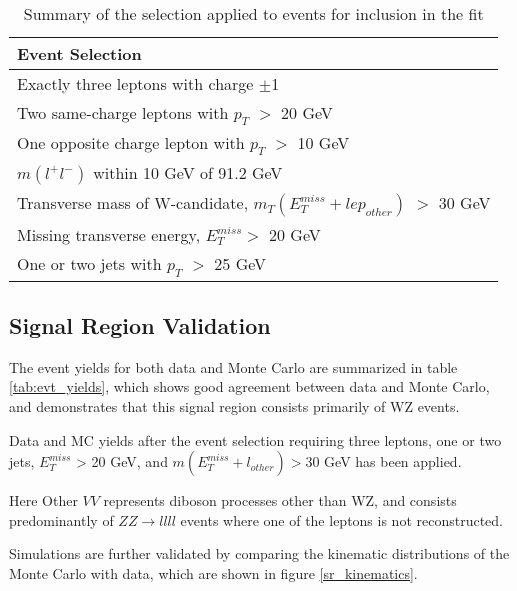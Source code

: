 \begin{table}[h]
    \centering
    \begin{tabular}{l}
        \hline\hline
        Event Selection\\
        \hline 
        Exactly three leptons with charge $\pm$1 \\
        Two same-charge leptons with $p_T$ $>$ 20 GeV \\
        One opposite charge lepton with $p_T$ $>$ 10 GeV \\
        $m(l^+l^-)$ within 10 GeV of 91.2 GeV \\
        Transverse mass of W-candidate, $m_T(E_T^{miss} + lep_{other})$ $>$ 30 GeV \\
        Missing transverse energy, $E_T^{miss} >$ 20 GeV \\
        One or two jets with $p_T$ $>$ 25 GeV \\
        \hline\hline
    \end{tabular}
    \caption{Summary of the selection applied to events for inclusion in the fit}
    \label{tbl:selection}
\end{table}

\subsection{Signal Region Validation}
\label{sec:SRkinematics}

The event yields for both data and Monte Carlo are summarized in table \ref{tab:evt_yields}, which shows good agreement between data and Monte Carlo, and demonstrates that this signal region consists primarily of WZ events.

\begin{table}[H]
    \centering
        
    \caption{Data and MC yields after the event selection requiring three leptons, one or two jets, $E^{miss}_T$ > 20 GeV, and $m(E^{miss}_T + l_{other}) > 30$ GeV has been applied.}
    \label{tab:evt_yields}
\end{table}

Here Other $VV$ represents diboson processes other than WZ, and consists predominantly of $ZZ\rightarrow llll$ events where one of the leptons is not reconstructed.

Simulations are further validated by comparing the kinematic distributions of the Monte Carlo with data, which are shown in figure \ref{sr_kinematics}.

